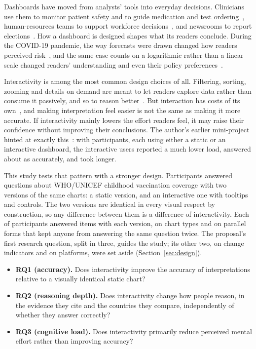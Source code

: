 \documentclass[10pt,twocolumn]{article}
\begin{document}
Dashboards have moved from analysts' tools into everyday decisions. Clinicians use them to monitor patient safety and to guide medication and test ordering~\cite{murphy2021,xie2022}, human-resources teams to support workforce decisions~\cite{marler2017}, and newsrooms to report elections~\cite{cai2024,alieva2023}. How a dashboard is designed shapes what its readers conclude. During the COVID-19 pandemic, the way forecasts were drawn changed how readers perceived risk~\cite{padilla2022}, and the same case counts on a logarithmic rather than a linear scale changed readers' understanding and even their policy preferences~\cite{romano2020}.

Interactivity is among the most common design choices of all. Filtering, sorting, zooming and details on demand are meant to let readers explore data rather than consume it passively, and so to reason better~\cite{yi2007,dimara2019}. But interaction has costs of its own~\cite{lam2008}, and making interpretation feel easier is not the same as making it more accurate. If interactivity mainly lowers the effort readers feel, it may raise their confidence without improving their conclusions. The author's earlier mini-project hinted at exactly this~\cite{rebollar2026mini}: with  participants, each using either a static or an interactive dashboard, the interactive users reported a much lower load, answered about as accurately, and took longer.

This study tests that pattern with a stronger design. Participants answered questions about WHO/UNICEF childhood vaccination coverage with two versions of the same charts: a static version, and an interactive one with tooltips and controls. The two versions are identical in every visual respect by construction, so any difference between them is a difference of interactivity. Each of  participants answered  items with each version, on  chart types and on parallel forms that kept anyone from answering the same question twice. The proposal's first research question, split in three, guides the study; its other two, on change indicators and on platforms, were set aside (Section~\ref{sec:design}).
\begin{itemize}
    \item \textbf{RQ1 (accuracy).} Does interactivity improve the accuracy of interpretations relative to a visually identical static chart?
    \item \textbf{RQ2 (reasoning depth).} Does interactivity change how people reason, in the evidence they cite and the countries they compare, independently of whether they answer correctly?
    \item \textbf{RQ3 (cognitive load).} Does interactivity primarily reduce perceived mental effort rather than improving accuracy?
\end{itemize}
\end{document}
